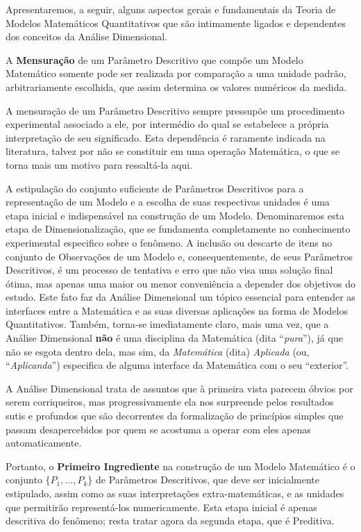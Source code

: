     Apresentaremos, a seguir, alguns aspectos gerais e fundamentais da Teoria de Modelos Matemáticos Quantitativos que são intimamente ligados e dependentes dos conceitos da Análise Dimensional.

    A \textbf{Mensuração} de um Parâmetro Descritivo que compõe um Modelo Matemático somente pode ser realizada por comparação a uma unidade padrão, arbitrariamente escolhida, que assim determina os valores numéricos da medida.

    A mensuração de um Parâmetro Descritivo sempre pressupõe um procedimento experimental associado a ele, por intermédio do qual se estabelece a própria interpretação de seu significado. Esta dependência é raramente indicada na literatura, talvez por não se constituir em uma operação Matemática, o que se torna mais um motivo para ressaltá-la aqui.

    A estipulação do conjunto suficiente de Parâmetros Descritivos para a representação de um Modelo e a escolha de suas respectivas unidades é uma etapa inicial e indispensável na construção de um Modelo. Denominaremos esta etapa de Dimensionalização, que se fundamenta completamente no conhecimento experimental especifico sobre o fenômeno. A inclusão ou descarte de itens no conjunto de Observações de um Modelo e, consequentemente, de seus Parâmetros Descritivos, é um processo de tentativa e erro que não visa uma solução final ótima, mas apenas uma maior ou menor conveniência a depender dos objetivos do estudo. Este fato faz da Análise Dimensional um tópico essencial para entender as interfaces entre a Matemática e as suas diversas aplicações na forma de Modelos Quantitativos. Também, torna-se imediatamente claro, mais uma vez, que a Análise Dimensional \textbf{não} é uma disciplina da Matemática (dita ``\textit{pura}''), já que não se esgota dentro dela, mas sim, da \textit{Matemática} (dita) \textit{Aplicada} (ou, ``\textit{Aplicanda}'') especifica de alguma interface da Matemática com o seu ``exterior''.

    A Análise Dimensional trata de assuntos que à primeira vista parecem óbvios por serem corriqueiros, mas progressivamente ela nos surpreende pelos resultados sutis e profundos que são decorrentes da formalização de princípios simples que passam desapercebidos por quem se acostuma a operar com eles apenas automaticamente.

    Portanto, o \textbf{Primeiro Ingrediente} na construção de um Modelo Matemático é o conjunto \(\{P_1, \ldots, P_k\}\) de Parâmetros Descritivos, que deve ser inicialmente estipulado, assim como as suas interpretações extra-matemáticas, e as unidades que permitirão representá-los numericamente. Esta etapa inicial é apenas descritiva do fenômeno; resta tratar agora da segunda etapa, que é Preditiva.


